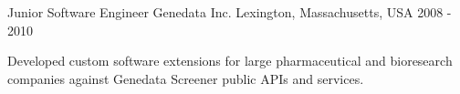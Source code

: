 \begin{cventries}
\cventry
{Junior Software Engineer} %
{Genedata Inc.} %
{Lexington, Massachusetts, USA} %
{2008 - 2010} %
{
  \begin{cvitems} %
    \item {Developed custom software extensions for large pharmaceutical and bioresearch companies against Genedata Screener public APIs and services.}
  \end{cvitems}
}


\end{cventries}
